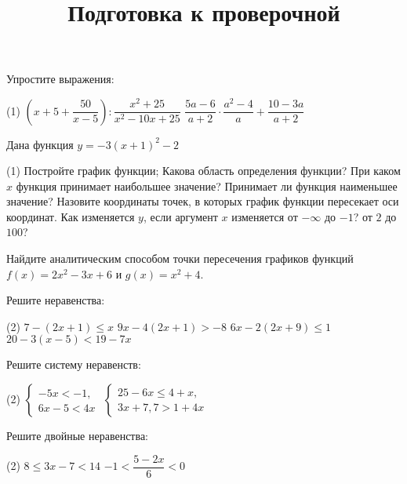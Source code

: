 \begin{class}[number=7]
	\title{Подготовка к проверочной}
	\begin{listofex}
		\item Упростите выражения:
		\begin{tasks}(1)
			\task \( \left( x+5+\dfrac{50}{x-5} \right):\dfrac{x^2+25}{x^2-10x+25} \)
			\task \( \dfrac{5a-6}{a+2}\cdot\dfrac{a^2-4}{a}+\dfrac{10-3a}{a+2} \)
		\end{tasks}
		\item Дана функция \( y=-3(x+1)^2-2 \)
		\begin{tasks}(1)
			\task Постройте график функции;
			\task Какова область определения функции?
			\task При каком \( x \) функция принимает наибольшее значение? Принимает ли функция наименьшее значение?
			\task Назовите координаты точек, в которых график функции пересекает оси координат.
			\task Как изменяется \( y \), если аргумент \( x \) изменяется от \( -\infty  \) до \( -1 \)? от \( 2 \) до \( 100 \)?
		\end{tasks}
		\item Найдите аналитическим способом точки пересечения графиков функций \(f(x)=2x^2-3x+6\)	и \( g(x)=x^2+4 \).
		\item Решите неравенства:
		\begin{tasks}(2)
			\task \( 7-(2x+1)\leq x \)
			\task \( 9x-4(2x+1)>-8 \)
			\task \( 6x-2(2x+9)\leq1 \)
			\task \( 20-3(x-5)<19-7x \)
		\end{tasks}
		\item Решите систему неравенств:
		\begin{tasks}(2)
			\task \( \left\{
			\begin{array}{l}
				-5x<-1,\\
				6x-5<4x
			\end{array}
			\right. \)
			\task \( \left\{
			\begin{array}{l}
				25-6x\leq4+x,\\
				3x+7,7>1+4x
			\end{array}
			\right. \)
		\end{tasks}
		\item Решите двойные неравенства:
		\begin{tasks}(2)
			\task \( 8\leq3x-7<14 \)
			\task \( -1<\dfrac{5-2x}{6}<0 \)
		\end{tasks}
	\end{listofex}
\end{class}

